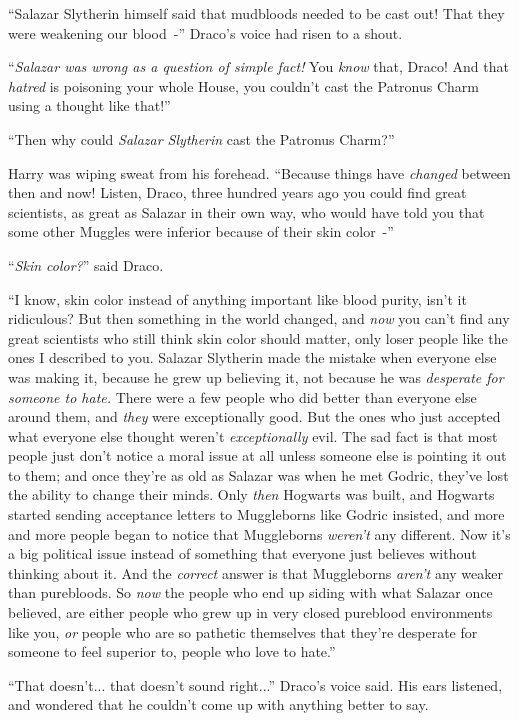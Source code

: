 ``Salazar Slytherin himself said that mudbloods needed to be cast out! That they were weakening our blood~-'' Draco's voice had risen to a shout.

``\emph{Salazar was wrong as a question of simple fact!} You \emph{know} that, Draco! And that \emph{hatred} is poisoning your whole House, you couldn't cast the Patronus Charm using a thought like that!''

``Then why could \emph{Salazar Slytherin} cast the Patronus Charm?''

Harry was wiping sweat from his forehead. ``Because things have \emph{changed} between then and now! Listen, Draco, three hundred years ago you could find great scientists, as great as Salazar in their own way, who would have told you that some other Muggles were inferior because of their skin color~-''

``\emph{Skin color?}'' said Draco.

``I know, skin color instead of anything important like blood purity, isn't it ridiculous? But then something in the world changed, and \emph{now} you can't find any great scientists who still think skin color should matter, only loser people like the ones I described to you. Salazar Slytherin made the mistake when everyone else was making it, because he grew up believing it, not because he was \emph{desperate for someone to hate.} There were a few people who did better than everyone else around them, and \emph{they} were exceptionally good. But the ones who just accepted what everyone else thought weren't \emph{exceptionally} evil. The sad fact is that most people just don't notice a moral issue at all unless someone else is pointing it out to them; and once they're as old as Salazar was when he met Godric, they've lost the ability to change their minds. Only \emph{then} Hogwarts was built, and Hogwarts started sending acceptance letters to Muggleborns like Godric insisted, and more and more people began to notice that Muggleborns \emph{weren't} any different. Now it's a big political issue instead of something that everyone just believes without thinking about it. And the \emph{correct} answer is that Muggleborns \emph{aren't} any weaker than purebloods. So \emph{now} the people who end up siding with what Salazar once believed, are either people who grew up in very closed pureblood environments like you, \emph{or} people who are so pathetic themselves that they're desperate for someone to feel superior to, people who love to hate.''

``That doesn't... that doesn't sound right...'' Draco's voice said. His ears listened, and wondered that he couldn't come up with anything better to say.

